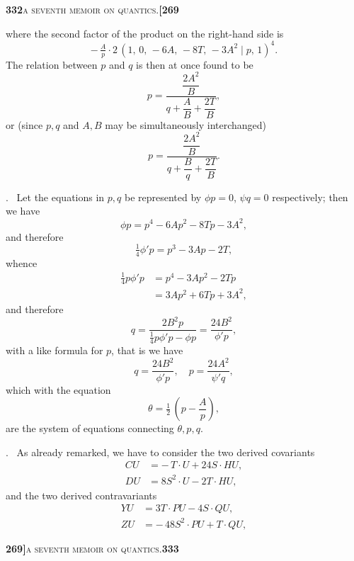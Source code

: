 \documentclass[11pt]{article}
\newcommand{\Cdel}{\mid}
\begin{document}
\newpage
\setcounter{page}{332}

\noindent\textbf{332}\hfill\textsc{a seventh memoir on quantics.}\hfill\textbf{[269}

\medskip

\noindent where the second factor of the product on the right-hand side is
\[
   -\,\tfrac{A}{p}\cdot 2\,(1,\,0,\,-6 A,\,-8 T,\,-3 A^2\Cdel p,\,1)^4.
\]
The relation between $p$ and $q$ is then at once found to be
\[
   p = \frac{\dfrac{2 A^2}{B}}{q + \dfrac{A}{B} + \dfrac{2 T}{B}},
\]
or (since $p, q$ and $A, B$ may be simultaneously interchanged)
\[
   p = \frac{\dfrac{2 A^2}{B}}{q + \dfrac{B}{q} + \dfrac{2 T}{B}}.
\]

\medskip

. \ Let the equations in $p, q$ be represented by $\phi p = 0$, $\psi q = 0$ respectively; then we have
\[
   \phi p = p^4 - 6 A p^2 - 8 T p - 3 A^2,
\]
and therefore
\[
   \tfrac{1}{4}\phi' p = p^3 - 3 A p - 2 T,
\]
whence
\[
\begin{aligned}
   \tfrac{1}{4}p\phi' p &= p^4 - 3 A p^2 - 2 T p\\
   &= 3 A p^2 + 6 T p + 3 A^2,
\end{aligned}
\]
and therefore
\[
   q = \frac{2 B^2 p}{\tfrac{1}{4}p\phi' p - \phi p} = \frac{24 B^2}{\phi' p},
\]
with a like formula for $p$, that is we have
\[
   q = \frac{24 B^2}{\phi' p},\quad p = \frac{24 A^2}{\psi' q},
\]
which with the equation
\[
   \theta = \tfrac{1}{2}\,\left(p - \frac{A}{p}\right),
\]
are the system of equations connecting $\theta, p, q$.

\medskip

. \ As already remarked, we have to consider the two derived covariants
\[
\begin{aligned}
   C U &= -\,T\cdot U + 24 S\cdot H U,\\
   D U &= 8 S^2\cdot U - 2 T\cdot H U,
\end{aligned}
\]
and the two derived contravariants
\[
\begin{aligned}
   Y U &= 3 T\cdot P U - 4 S\cdot Q U,\\
   Z U &= -\,48 S^2\cdot P U + T\cdot Q U,
\end{aligned}
\]

\newpage
\setcounter{page}{333}

\noindent\textbf{269]}\hfill\textsc{a seventh memoir on quantics.}\hfill\textbf{333}

\medskip
\end{document}
